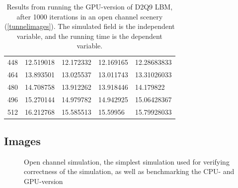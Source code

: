 \begin{table}[H]
\begin{tabular}{lllll}
448&	12.519018&	12.172332&	12.169165&	12.28683833\\
464&	13.893501&	13.025537&	13.011743&	13.31026033\\
480&	14.708758&	13.912262&	13.918446&	14.179822\\
496&	15.270144&	14.979782&	14.942925&	15.06428367\\
512&	16.212768&	15.585513&	15.59956	&	15.79928033\\
\bottomrule
\end{tabular}
\caption{Results from running the GPU-version of D2Q9 LBM, after 1000 iterations in an open channel scenery (\autoref{tunnelimages}). The simulated field is the independent variable, and the running time is the dependent variable.}
\label{resultgpu}
\end{table}

\subsection{Images}
\begin{figure}[H]
\centering
{}
\hspace{1pt}
\caption{Open channel simulation, the simplest simulation used for verifying correctness of the simulation, as well as benchmarking the CPU- and GPU-version}
\label{tunnelimages}
\end{figure}